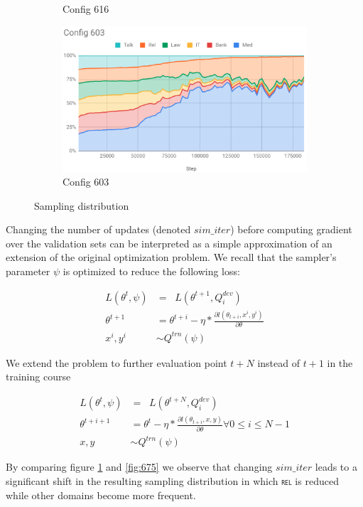 \documentclass[12pt,times,a4paper,twoside]{article}
\newcommand{\domain}[1]{\texttt{\textsc{#1}}}
\theoremstyle{definition}
\begin{document}
\begin{figure}[htb]
\begin{subfigure}{.5\textwidth}
  \caption{Config 616}
  \label{fig:616}
\end{subfigure}
\begin{subfigure}{.5\textwidth}
  \centering
  \includegraphics[width=.8\linewidth]{config603.png}  
  \caption{Config 603}
  \label{fig:603}
\end{subfigure}
\caption{Sampling distribution}
\label{fig:sampling}
\end{figure}

Changing the number of updates (denoted $sim\_iter$) before computing gradient over the validation sets can be interpreted as a simple approximation of an extension of the original optimization problem. We recall that the sampler's parameter $\psi$ is optimized to reduce the following loss:

\begin{align*}
L(\theta^t,\psi) &=  \displaystyle{\mathop{\sum_{i=1}^k}} L(\theta^{t+1}, Q^{dev}_i) \\
\theta^{t+1} &= \theta^{t+i} - \eta * \frac{\partial l(\theta_{t+i}, x^i,y^i)}{\partial \theta} \\
x^i,y^i &\sim Q^{trn}(\psi)
\end{align*}

We extend the problem to further evaluation point $t+N$ instead of $t+1$ in the training course

\begin{align*}
L(\theta^t,\psi) &=  \displaystyle{\mathop{\sum_{i=1}^k}} L(\theta^{t+N}, Q^{dev}_i) \\
\theta^{t+i+1} &= \theta^t - \eta * \frac{\partial l(\theta_{t+i}, x,y)}{\partial \theta} \forall 0 \leq i \leq N-1\\
x,y &\sim Q^{trn}(\psi)
\end{align*}

By comparing figure \ref{fig:616} and \ref{fig:675} we observe that changing $sim\_iter$ leads to a significant shift in the resulting sampling distribution in which \domain{rel} is reduced while other domains become more frequent.
\end{document}
